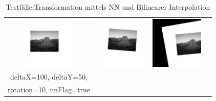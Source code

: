 \documentclass[12pt,german]{article}
\begin{document}
\begin{table}[H]
\begin{tabular}{| c | c | c | c |}
    \includegraphics[width=2.5cm]{images/register/first-half-image-01.jpg} &
    \includegraphics[width=2.5cm]{images/register/second-half-image-01.jpg} &
    \includegraphics[width=2.5cm]{images/register/transformed-image-04.jpg} \\
     deltaX=100, deltaY=50, \\rotation=10, nnFlag=true \\
    \hline
    
  \end{tabular}
  \caption{Testfälle:Transformation mittels NN und Bilinearer Interpolation}
  \label{tab:registerTest}
\end{table}



\end{document}
